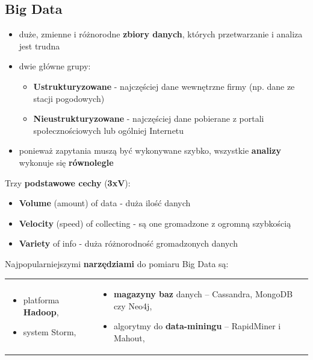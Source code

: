 \documentclass[a4paper]{article}
\begin{document}
    \subsection{Big Data}
    \begin{itemize}
        \item duże, zmienne i różnorodne \textbf{zbiory danych}, których przetwarzanie i analiza jest trudna
        \item dwie główne grupy:
        \begin{itemize}
            \item \textbf{Ustrukturyzowane} - najczęściej dane wewnętrzne firmy (np. dane ze stacji pogodowych)
            \item \textbf{Nieustrukturyzowane} - najczęściej dane pobierane z portali społecznościowych lub ogólniej Internetu
        \end{itemize}
        \item ponieważ zapytania muszą być wykonywane szybko, wszystkie \textbf{analizy} wykonuje się \textbf{równolegle}
    \end{itemize}

    Trzy \textbf{podstawowe cechy} (\textbf{3xV}):
    \begin{itemize}
        \item \textbf{Volume} (amount) of data - duża ilość danych
        \item \textbf{Velocity} (speed) of collecting - są one gromadzone z ogromną szybkością
        \item \textbf{Variety} of info - duża różnorodność gromadzonych danych
    \end{itemize}

    Najpopularniejszymi \textbf{narzędziami} do pomiaru Big Data są:
    \begin{table}[H]
        \begin{center}
            \begin{tabular}{p{5cm} p{10cm}}
                \begin{itemize}
                    \item platforma \textbf{Hadoop},
                    \item system Storm,
                \end{itemize}
                &
                \begin{itemize}
                    \item \textbf{magazyny baz} danych – Cassandra, MongoDB czy Neo4j,
                    \item algorytmy do \textbf{data-miningu} – RapidMiner i Mahout,
                \end{itemize}
            \end{tabular}
        \end{center}
    \end{table}
\end{document}
